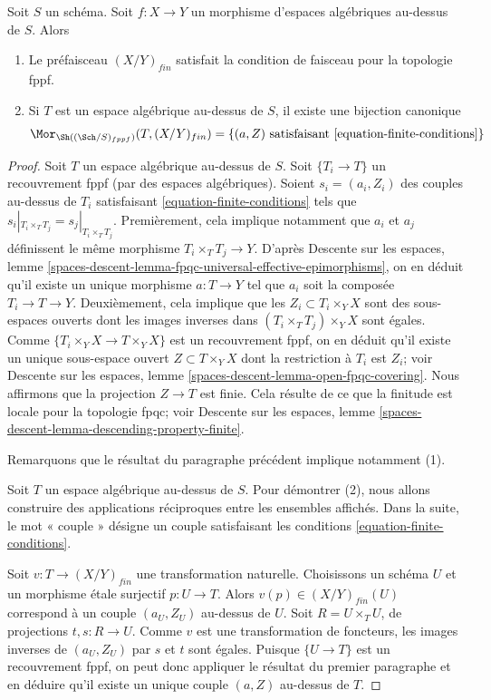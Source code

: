 \begin{lemma}
\label{lemma-finite-sheaf}
Soit $S$ un schéma.
Soit $f : X \to Y$ un morphisme d'espaces algébriques au-dessus de $S$.
Alors
\begin{enumerate}
\item Le préfaisceau $(X/Y)_{fin}$ satisfait la condition de faisceau pour
la topologie fppf.
\item Si $T$ est un espace algébrique au-dessus de $S$, il existe une
bijection canonique
$$
\Mor_{\Sh((\Sch/S)_{fppf})}(T, (X/Y)_{fin})
=
\{(a, Z)\text{ satisfaisant \ref{equation-finite-conditions}}\}
$$
\end{enumerate}
\end{lemma}

\begin{proof}
Soit $T$ un espace algébrique au-dessus de $S$.
Soit $\{T_i \to T\}$ un recouvrement fppf (par des espaces algébriques).
Soient $s_i = (a_i, Z_i)$ des couples au-dessus de $T_i$
satisfaisant \ref{equation-finite-conditions}
tels que $s_i|_{T_i \times_T T_j} = s_j|_{T_i \times_T T_j}$.
Premièrement, cela implique notamment que $a_i$ et $a_j$ définissent le même
morphisme $T_i \times_T T_j \to Y$. D'après
Descente sur les espaces,
lemme \ref{spaces-descent-lemma-fpqc-universal-effective-epimorphisms},
on en déduit qu'il existe un unique morphisme $a : T \to Y$
tel que $a_i$ soit la composée $T_i \to T \to Y$.
Deuxièmement, cela implique que les $Z_i \subset T_i \times_Y X$ sont des sous-espaces
ouverts dont les images inverses dans $(T_i \times_T T_j) \times_Y X$ sont égales.
Comme $\{T_i \times_Y X \to T \times_Y X\}$ est un recouvrement fppf,
on en déduit qu'il existe un unique sous-espace ouvert $Z \subset T \times_Y X$
dont la restriction à $T_i$ est $Z_i$; voir
Descente sur les espaces, lemme \ref{spaces-descent-lemma-open-fpqc-covering}.
Nous affirmons que la projection $Z \to T$ est finie.
Cela résulte de ce que la finitude est locale pour la topologie fpqc; voir
Descente sur les espaces, lemme \ref{spaces-descent-lemma-descending-property-finite}.

\medskip\noindent
Remarquons que le résultat du paragraphe précédent implique notamment (1).

\medskip\noindent
Soit $T$ un espace algébrique au-dessus de $S$. Pour démontrer (2), nous allons
construire des applications réciproques entre les ensembles affichés. Dans la
suite, le mot « couple » désigne un couple satisfaisant les
conditions \ref{equation-finite-conditions}.

\medskip\noindent
Soit $v : T \to (X/Y)_{fin}$ une transformation naturelle.
Choisissons un schéma $U$ et un morphisme étale surjectif $p : U \to T$.
Alors $v(p) \in (X/Y)_{fin}(U)$ correspond à un couple $(a_U, Z_U)$
au-dessus de $U$. Soit $R = U \times_T U$, de projections $t, s : R \to U$.
Comme $v$ est une transformation de foncteurs, les images inverses de
$(a_U, Z_U)$ par $s$ et $t$ sont égales. Puisque $\{U \to T\}$ est un
recouvrement fppf, on peut donc appliquer le résultat du premier paragraphe et
en déduire qu'il existe un unique couple $(a, Z)$ au-dessus de $T$.


\end{proof}
